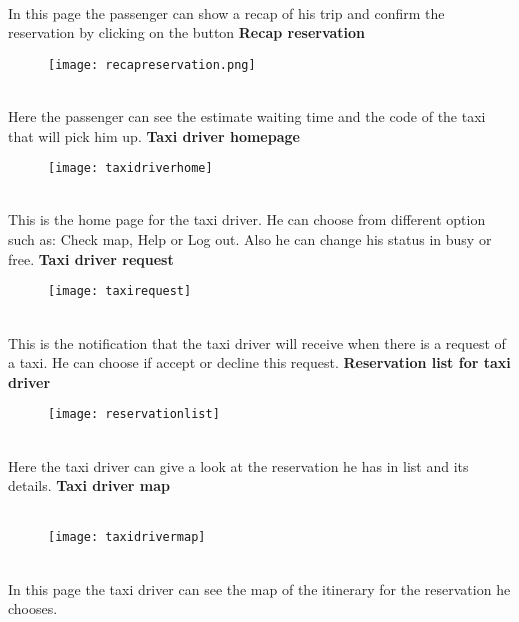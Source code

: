 \documentclass[12pt, oneside]{book}   	%
\begin{document}
\\
In this page the passenger can show a recap of his trip and confirm the reservation by clicking on the button
\clearpage
\hspace*{\fill}
\textbf{\large Recap reservation}
\hspace*{\fill}
\begin{figure}[h]
\center \texttt{[image: recapreservation.png]}
\end{figure}
\\
Here the passenger can see the estimate waiting time and the code of the taxi that will pick him up.
\clearpage
\hspace*{\fill}
\textbf{\large Taxi driver homepage}
\hspace*{\fill}
\\
\begin{figure}[h]
\center \texttt{[image: taxidriverhome]}
\end{figure}
\\
This is the home page for the taxi driver. He can choose from different option such as: Check map, Help or Log out. Also he can change his status in busy or free.
\clearpage
\hspace*{\fill}
\textbf{\large Taxi driver request}
\hspace*{\fill}
\\
\begin{figure}[h]
\center \texttt{[image: taxirequest]}
\end{figure}
\\
This is the notification that the taxi driver will receive when there is a request of a taxi. He can choose if accept or decline this request.
\clearpage
\hspace*{\fill}
\textbf{\large Reservation list for taxi driver}
\hspace*{\fill}
\\
\begin{figure}[h]
\center \texttt{[image: reservationlist]}
\end{figure}
\\
Here the taxi driver can give a look at the reservation he has in list and its details.
\clearpage
\hspace*{\fill}
\textbf{\large Taxi driver map}
\hspace*{\fill}
\\
\\
\begin{figure}[h]
\center \texttt{[image: taxidrivermap]}
\end{figure}
\\
In this page the taxi driver can see the map of the itinerary for the reservation he chooses.
\clearpage
\end{document}
